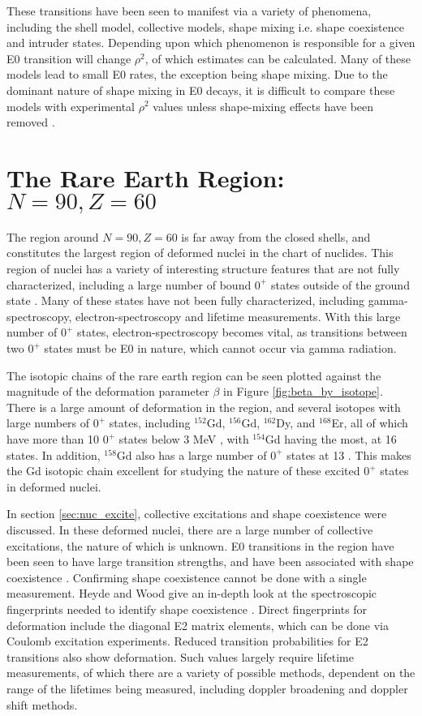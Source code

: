 These transitions have been seen to manifest via a variety of phenomena, including the shell model, collective models, shape mixing i.e. shape coexistence and intruder states\citep{wood99:_e0}. Depending upon which phenomenon is responsible for a given E0 transition will change $\rho^2$, of which estimates can be calculated. Many of these models lead to small E0 rates, the exception being shape mixing. Due to the dominant nature of shape mixing in E0 decays, it is difficult to compare these models with experimental $\rho^2$ values unless shape-mixing effects have been removed \citep{wood99:_e0}.

\section{The Rare Earth Region: $N=90,Z=60$}
\label{sec:rare_earth}

The region around $N=90,Z=60$ is far away from the closed shells, and constitutes the largest region of deformed nuclei in the chart of nuclides. This region of nuclei has a variety of interesting structure features that are not fully characterized, including a large number of bound $0^+$ states outside of the ground state \citep{meyer06:_zeroplus}. Many of these states have not been fully characterized, including gamma-spectroscopy, electron-spectroscopy and lifetime measurements. With this large number of $0^+$ states, electron-spectroscopy becomes vital, as transitions between two $0^+$ states must be E0 in nature, which cannot occur via gamma radiation.

The isotopic chains of the rare earth region can be seen plotted against the magnitude of the deformation parameter $\beta$ in Figure \ref{fig:beta_by_isotope}. There is a large amount of deformation in the region, and several isotopes with large numbers of $0^+$ states, including $^{152}$Gd, $^{156}$Gd, $^{162}$Dy, and $^{168}$Er, all of which have more than 10 $0^+$ states below 3 MeV \citep{meyer06:_zeroplus}, with $^{154}$Gd having the most, at 16 states. In addition, $^{158}$Gd also has a large number of $0^+$ states at 13 \citep{lesher02:_158gd}. This makes the Gd isotopic chain excellent for studying the nature of these excited $0^+$ states in deformed nuclei.

In section \ref{sec:nuc_excite}, collective excitations and shape coexistence were discussed. In these deformed nuclei, there are a large number of collective excitations, the nature of which is unknown. E0 transitions in the region have been seen to have large transition strengths, and have been associated with shape coexistence \citep{wood99:_e0}. Confirming shape coexistence cannot be done with a single measurement. Heyde and Wood give an in-depth look at the spectroscopic fingerprints needed to identify shape coexistence \citep{heyde11:_shape_coexist}. Direct fingerprints for deformation include the diagonal E2 matrix elements, which can be done via Coulomb excitation experiments. Reduced transition probabilities for E2 transitions also show deformation. Such values largely require lifetime measurements, of which there are a variety of possible methods, dependent on the range of the lifetimes being measured, including doppler broadening and doppler shift methods. 

